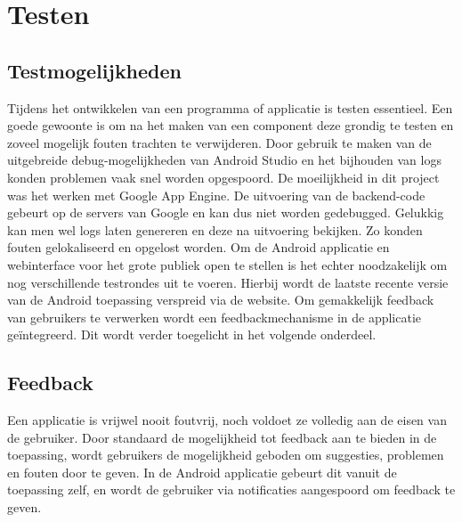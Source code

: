 \chapter{Testen}%
\section{Testmogelijkheden}
Tijdens het ontwikkelen van een programma of applicatie is testen essentieel. Een goede gewoonte is om na het maken van een component deze grondig te testen en zoveel mogelijk fouten trachten te verwijderen.
Door gebruik te maken van de uitgebreide debug-mogelijkheden van Android Studio en het bijhouden van logs konden problemen vaak snel worden opgespoord. De moeilijkheid in dit project was het werken met Google App Engine. De uitvoering van de backend-code gebeurt op de servers van Google en kan dus niet worden gedebugged. Gelukkig kan men wel logs laten genereren en deze na uitvoering bekijken.
Zo konden fouten gelokaliseerd en opgelost worden.
Om de Android applicatie en webinterface voor het grote publiek open te stellen is het echter noodzakelijk om nog verschillende testrondes uit te voeren. Hierbij wordt de laatste recente versie van de Android toepassing verspreid via de website. Om gemakkelijk feedback van gebruikers te verwerken wordt een feedbackmechanisme in de applicatie geïntegreerd. Dit wordt verder toegelicht in het volgende onderdeel.

\section{Feedback}
Een applicatie is vrijwel nooit foutvrij, noch voldoet ze volledig aan de eisen van de gebruiker. Door standaard de mogelijkheid tot feedback aan te bieden in de toepassing, wordt gebruikers de mogelijkheid geboden om suggesties, problemen en fouten door te geven.
In de Android applicatie gebeurt dit vanuit de toepassing zelf, en wordt de gebruiker via notificaties aangespoord om feedback te geven.

